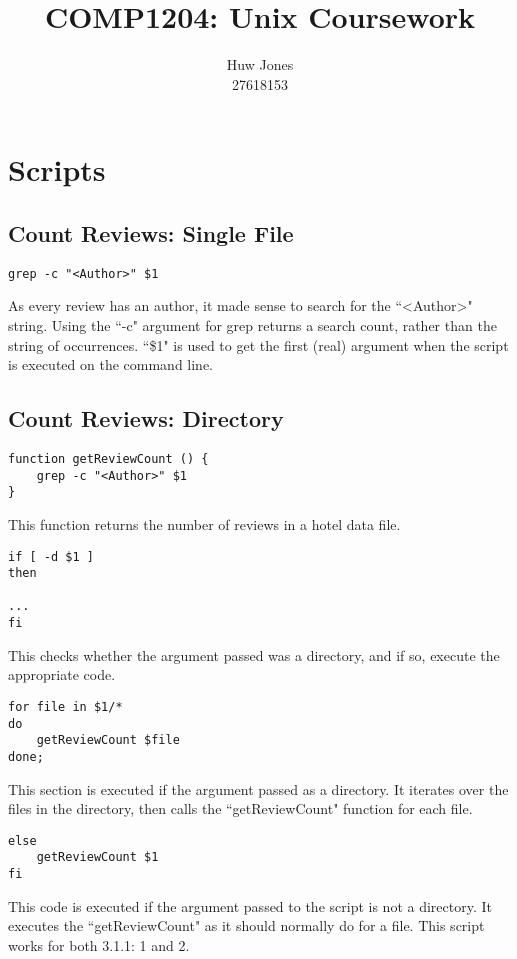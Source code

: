 \documentclass[a4paper]{article}
\author{Huw Jones \\27618153}
\title{COMP1204: Unix Coursework}
\begin{document}
\maketitle
\newpage

\section{Scripts}

%
\subsection{Count Reviews: Single File}

\begin{lstlisting}
grep -c "<Author>" $1
\end{lstlisting}
As every review has an author, it made sense to search for the ``\textless Author\textgreater" string.
Using the ``-c" argument for grep returns a search count, rather than the string of occurrences.
``\$1" is used to get the first (real) argument when the script is executed on the command line.

%
\subsection{Count Reviews: Directory}

\begin{lstlisting}
function getReviewCount () {
	grep -c "<Author>" $1
}
\end{lstlisting}
This function returns the number of reviews in a hotel data file.

\begin{lstlisting}
if [ -d $1 ]
then

...
fi
\end{lstlisting}
This checks whether the argument passed was a directory, and if so, execute the appropriate code.

\begin{lstlisting}
for file in $1/*
do
	getReviewCount $file
done;
\end{lstlisting}
This section is executed if the argument passed as a directory.
It iterates over the files in the directory, then calls the ``getReviewCount" function for each file.

\begin{lstlisting}
else
	getReviewCount $1
fi
\end{lstlisting}
This code is executed if the argument passed to the script is not a directory.
It executes the ``getReviewCount" as it should normally do for a file. \newline \newline
This script works for both 3.1.1: 1 and 2.
\end{document}
